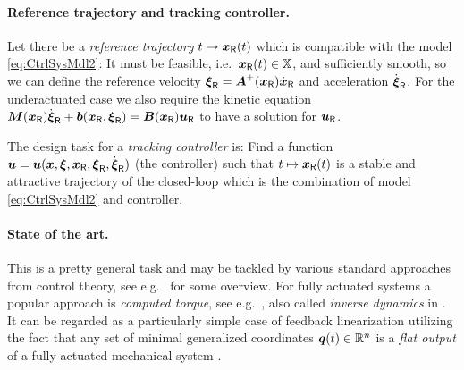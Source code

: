 
\paragraph{Reference trajectory and tracking controller.}
Let there be a \textit{reference trajectory} $t\mapsto\boldsymbol{x}_{\mathsf{R}}(t)$ which is compatible with the model \eqref{eq:CtrlSysMdl2}:
It must be feasible, i.e.\ $\boldsymbol{x}_{\mathsf{R}}(t)\in\mathbb{X}$, and sufficiently smooth, so we can define the reference velocity $\boldsymbol{\xi}_{\mathsf{R}} = \boldsymbol{A}^+(\boldsymbol{x}_{\mathsf{R}}) \dot{\boldsymbol{x}}_{\mathsf{R}}$ and acceleration $\dot{\boldsymbol{\xi}}_{\mathsf{R}}$.
For the underactuated case we also require the kinetic equation $\boldsymbol{M}(\boldsymbol{x}_{\mathsf{R}}) \dot{\boldsymbol{\xi}}_{\mathsf{R}} + \boldsymbol{b}(\boldsymbol{x}_{\mathsf{R}},\boldsymbol{\xi}_{\mathsf{R}}) = \boldsymbol{B}(\boldsymbol{x}_{\mathsf{R}})\boldsymbol{u}_{\mathsf{R}}$ to have a solution for $\boldsymbol{u}_{\mathsf{R}}$.

The design task for a \textit{tracking controller} is: 
Find a function $\boldsymbol{u} = \boldsymbol{u}(\boldsymbol{x}, \boldsymbol{\xi}, \boldsymbol{x}_{\mathsf{R}}, \boldsymbol{\xi}_{\mathsf{R}}, \dot{\boldsymbol{\xi}}_{\mathsf{R}})$ (the controller) such that $t \mapsto \boldsymbol{x}_{\mathsf{R}}(t)$ is a stable and attractive trajectory of the closed-loop which is the combination of model \eqref{eq:CtrlSysMdl2} and controller.

\paragraph{State of the art.}
This is a pretty general task and may be tackled by various standard approaches from control theory, see e.g.\ \cite[chap.\ 7-10]{Spong:RobotModelingAndControl} for some overview.
For fully actuated systems a popular approach is \textit{computed torque}, see e.g.\ \cite[sec.\ 4.5.2]{Murray:Robotic}, also called \textit{inverse dynamics} in \cite[sec.\ 8.3]{Spong:RobotModelingAndControl}.
It can be regarded as a particularly simple case of feedback linearization utilizing the fact that any set of minimal generalized coordinates $\boldsymbol{q}(t)\in\mathbb{R}^{n}$ is a \textit{flat output} of a fully actuated mechanical system \cite[sec.\ 7.1]{Martin:FlatSystems}.

